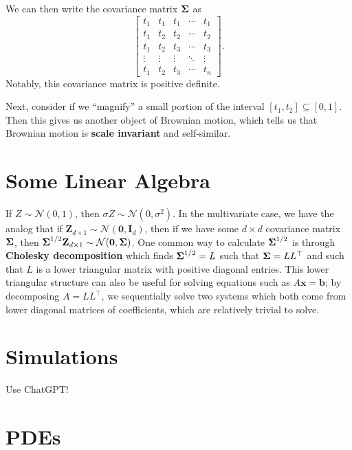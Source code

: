 We can then write the covariance matrix $\boldsymbol{\Sigma}$ as $$ \begin{bmatrix}
	t_1 & t_1 & t_1 & \cdots & t_1 \\
	t_1 & t_2 & t_2 & \cdots & t_2 \\
	t_1 & t_2 & t_3 & \cdots & t_3 \\
	\vdots & \vdots & \vdots & \ddots & \vdots \\
	t_1 & t_2 & t_3 & \cdots & t_n
\end{bmatrix}. $$ Notably, this covariance matrix is positive definite.

Next, consider if we ``magnify'' a small portion of the interval $[t_1,t_2]\subseteq[0,1]$. Then this gives us another object of Brownian motion, which tells us that Brownian motion is \textbf{scale invariant} and self-similar.


\section{Some Linear Algebra}
If $Z\sim\mathcal N(0,1)$, then $\sigma Z\sim\mathcal N(0,\sigma^2)$. In the multivariate case, we have the analog that if $\mathbf Z_{d\times 1}\sim\mathcal N(\mathbf 0,\mathbf I_d)$, then if we have some $d\times d$ covariance matrix $\boldsymbol{\Sigma}$, then $\boldsymbol{\Sigma}^{1/2}\mathbf Z_{d\times 1}\sim\mathcal N(\mathbf 0,\boldsymbol{\Sigma})$. One common way to calculate $\boldsymbol{\Sigma}^{1/2}$ is through \textbf{Cholesky decomposition} which finds $\boldsymbol{\Sigma}^{1/2}=L$ such that $\boldsymbol{\Sigma} = LL^\top$ and such that $L$ is a lower triangular matrix with positive diagonal entries. This lower triangular structure can also be useful for solving equations such as $A\mathbf x=\mathbf b$; by decomposing $A=LL^\top$, we sequentially solve two systems which both come from lower diagonal matrices of coefficients, which are relatively trivial to solve.


\section{Simulations}
Use ChatGPT!

\section{PDEs}

